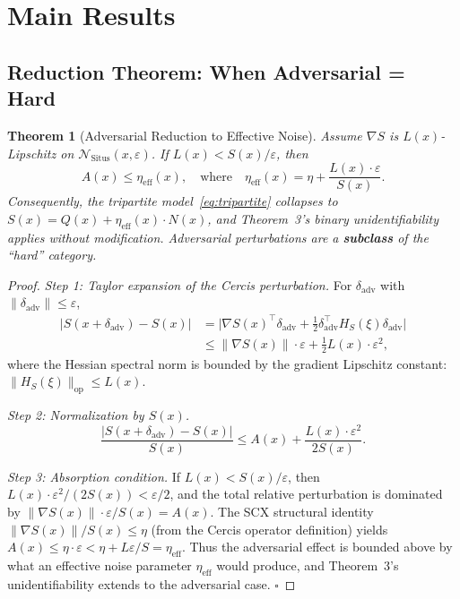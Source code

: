 \documentclass[12pt,a4paper]{article}
\newtheorem{theorem}{Theorem}[section]
\newcommand{\cN}{\mathcal{N}}
\newcommand{\Situs}{\mathrm{Situs}}
\begin{document}
\section{Main Results}

\subsection{Reduction Theorem: When Adversarial = Hard}

\begin{theorem}[Adversarial Reduction to Effective Noise]
\label{thm:reduction}
Assume $\nabla S$ is $L(x)$-Lipschitz on $\cN_{\Situs}(x, \varepsilon)$.
If $L(x) < S(x)/\varepsilon$, then
\begin{equation}\label{eq:reduction-bound}
    A(x) \leq \eta_{\mathrm{eff}}(x),
    \quad\text{where}\quad
    \eta_{\mathrm{eff}}(x) = \eta + \frac{L(x) \cdot \varepsilon}{S(x)}.
\end{equation}
Consequently, the tripartite model~\eqref{eq:tripartite} collapses to
$S(x) = Q(x) + \eta_{\mathrm{eff}}(x) \cdot N(x)$, and Theorem~3's binary
unidentifiability applies without modification.  Adversarial perturbations
are a \textbf{subclass} of the ``hard'' category.
\end{theorem}

\begin{proof}
\textit{Step 1: Taylor expansion of the Cercis perturbation.}
For $\delta_{\mathrm{adv}}$ with $\|\delta_{\mathrm{adv}}\| \leq \varepsilon$,
\begin{align}
    |S(x + \delta_{\mathrm{adv}}) - S(x)|
    &= \big|\nabla S(x)^\top \delta_{\mathrm{adv}}
       + \tfrac{1}{2}\delta_{\mathrm{adv}}^\top H_S(\xi) \delta_{\mathrm{adv}}\big|
       \label{eq:taylor} \\
    &\leq \|\nabla S(x)\| \cdot \varepsilon
       + \tfrac{1}{2} L(x) \cdot \varepsilon^2,
       \label{eq:taylor-bound}
\end{align}
where the Hessian spectral norm is bounded by the gradient Lipschitz constant:
$\|H_S(\xi)\|_{\mathrm{op}} \leq L(x)$.

\textit{Step 2: Normalization by $S(x)$.}
\begin{equation}\label{eq:normalized}
    \frac{|S(x + \delta_{\mathrm{adv}}) - S(x)|}{S(x)}
    \leq A(x) + \frac{L(x) \cdot \varepsilon^2}{2 S(x)}.
\end{equation}

\textit{Step 3: Absorption condition.}
If $L(x) < S(x)/\varepsilon$, then $L(x) \cdot \varepsilon^2 / (2S(x)) <
\varepsilon/2$, and the total relative perturbation is dominated by
$\|\nabla S(x)\| \cdot \varepsilon / S(x) = A(x)$.  The SCX structural
identity $\|\nabla S(x)\|/S(x) \leq \eta$ (from the Cercis operator
definition) yields $A(x) \leq \eta \cdot \varepsilon < \eta + L\varepsilon/S
= \eta_{\mathrm{eff}}$.  Thus the adversarial effect is bounded above by
what an effective noise parameter $\eta_{\mathrm{eff}}$ would produce, and
Theorem~3's unidentifiability extends to the adversarial case.  $\square$
\end{proof}
\end{document}
